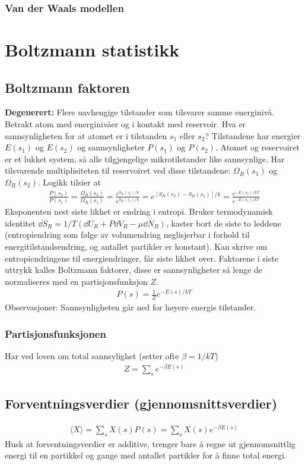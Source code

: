 \documentclass[12pt]{article}
\newcommand{\mean}[1]{\langle #1 \rangle}
\begin{document}
\subsubsection{Van der Waals modellen}
\section{Boltzmann statistikk}
\subsection{Boltzmann faktoren}
\textbf{Degenerert:} Flere uavhengige tilstander som tilsvarer samme energinivå.
Betrakt atom med energinivåer og i kontakt med reservoir. Hva er sannsynligheten
for at atomet er i tilstanden $s_1$ eller $s_2$? Tilstandene har energier $E(s_1)$
og $E(s_2)$ og sannsynligheter $P(s_1)$ og $P(s_2)$. Atomet og reservoiret er
et lukket system, så alle tilgjengelige mikrotilstander like sannsynlige. Har tilsvarende
multiplisiteten til reservoiret ved disse tilstandene: $\Omega_R(s_1)$ og $\Omega_R(s_2)$.
Logikk tilsier at
\begin{align*}
  \frac{P(s_2)}{P(s_1)} = \frac{\Omega_R(s_2)}{\Omega_R(s_1)} = \frac{e^{S_R(s_2)/k}}{e^{S_R(s_1)/k}} = e^{[S_R(s_2) - S_R(s_1)]/k} = \frac{e^{-E(s_2)/kT}}{e^{-E(s_1)/kT}}
\end{align*}
Eksponenten  nest siste likhet er endring i entropi. Bruker termodynamisk identitet $\dd S_R = 1/T (\dd U_R + P \dd V_R - \mu \dd N_R)$,
kaster bort de siste to leddene (entropiendring som følge av volumendring neglisjerbar i forhold til energitilstandsendring, og
antallet partikler er konstant). Kan skrive om entropiendringene til energiendringer, får siste likhet over. Faktorene i siste
uttrykk kalles Boltzmann faktorer, disse er sannsynligheter så lenge de normaliseres med en partisjonsfunksjon $Z$.
\begin{align*}
  P(s) = \frac{1}{Z} e^{-E(s)/kT}
\end{align*}
Observasjoner: Sannsynligheten går ned for høyere energis tilstander.
\subsubsection{Partisjonsfunksjonen}
Har ved loven om total sannsylighet (setter ofte $\beta = 1 / kT$)
\begin{align*}
  Z = \sum_s e^{-\beta E(s)}
\end{align*}
\subsection{Forventningsverdier (gjennomsnittsverdier)}
\begin{align*}
  \mean{X} = \sum_s X(s) P(s) = \sum_s X(s) e^{-\beta E(s)}
\end{align*}
Husk at forventningsverdier er additive, trenger bare å regne ut gjennomsnittlig
energi til en partikkel og gange med antallet partikler for å finne total energi.
\end{document}
